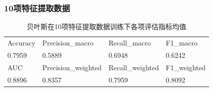 \documentclass[10pt]{article}
\begin{document}
\subsubsection*{10项特征提取数据}
\begin{table}[H]
  \centering
  \caption{贝叶斯在10项特征提取数据训练下各项评估指标均值}
  \begin{tabular}{llll}
  \toprule
  Accuracy & Precision\_macro & Recall\_macro & F1\_macro \\
  0.7959 & 0.5889 & 0.6948 & 0.6242 \\
  \midrule
  AUC & Precision\_weighted & Recall\_weighted & F1\_weighted \\
  0.8896 & 0.8357 & 0.7959 & 0.8092 \\
  \bottomrule
  \end{tabular}
\end{table}
\end{document}
